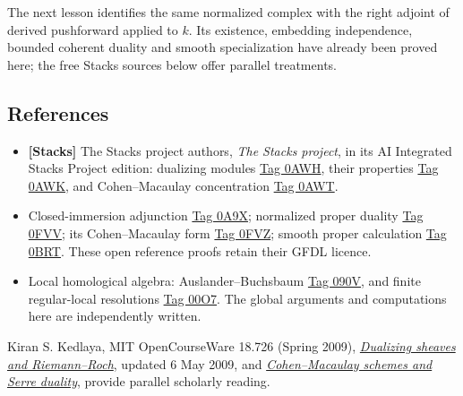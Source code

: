 \documentclass[11pt]{article}
\providecommand{\tightlist}{\setlength{\itemsep}{0pt}\setlength{\parskip}{0pt}}
\begin{document}
The next lesson identifies the same normalized complex with the right
adjoint of derived pushforward applied to \(k\). Its existence,
embedding independence, bounded coherent duality and smooth
specialization have already been proved here; the free Stacks sources
below offer parallel treatments.

\subsection{References}\label{references-7}

\begin{itemize}
\tightlist
\item
  \textbf{{[}Stacks{]}} The Stacks project authors, \emph{The Stacks
  project}, in its AI Integrated Stacks Project edition: dualizing
  modules
  \href{https://kokunoyumeto.github.io/stacks-zh-hans-cn/en/duality.html\#duality-section-dualizing-module}{Tag
  0AWH}, their properties
  \href{https://kokunoyumeto.github.io/stacks-zh-hans-cn/en/duality.html\#duality-lemma-dualizing-module}{Tag
  0AWK}, and Cohen--Macaulay concentration
  \href{https://kokunoyumeto.github.io/stacks-zh-hans-cn/en/duality.html\#duality-lemma-dualizing-module-CM-scheme}{Tag
  0AWT}.
\item
  Closed-immersion adjunction
  \href{https://kokunoyumeto.github.io/stacks-zh-hans-cn/en/duality.html\#duality-lemma-twisted-inverse-image-closed}{Tag
  0A9X}; normalized proper duality
  \href{https://kokunoyumeto.github.io/stacks-zh-hans-cn/en/duality.html\#duality-lemma-duality-proper-over-field}{Tag
  0FVV}; its Cohen--Macaulay form
  \href{https://kokunoyumeto.github.io/stacks-zh-hans-cn/en/duality.html\#duality-lemma-duality-proper-over-field-CM}{Tag
  0FVZ}; smooth proper calculation
  \href{https://kokunoyumeto.github.io/stacks-zh-hans-cn/en/duality.html\#duality-lemma-smooth-proper}{Tag
  0BRT}. These open reference proofs retain their GFDL licence.
\item
  Local homological algebra: Auslander--Buchsbaum
  \href{https://kokunoyumeto.github.io/stacks-zh-hans-cn/en/algebra.html\#algebra-proposition-Auslander-Buchsbaum}{Tag
  090V}, and finite regular-local resolutions
  \href{https://kokunoyumeto.github.io/stacks-zh-hans-cn/en/algebra.html\#algebra-proposition-regular-finite-gl-dim}{Tag
  00O7}. The global arguments and computations here are independently
  written.
\end{itemize}

Kiran S. Kedlaya, MIT OpenCourseWare 18.726 (Spring 2009),
\href{https://ocw.mit.edu/courses/18-726-algebraic-geometry-spring-2009/be1fa559e68ba14f8cefb4484bc54de1_MIT18_726s09_lec24_dualizing.pdf}{\emph{Dualizing
sheaves and Riemann--Roch}}, updated 6 May 2009, and
\href{https://ocw.mit.edu/courses/18-726-algebraic-geometry-spring-2009/0ea66a0bdcf4f8127c826882531f1642_MIT18_726s09_lec25_serre_dual.pdf}{\emph{Cohen--Macaulay
schemes and Serre duality}}, provide parallel scholarly reading.
\end{document}
